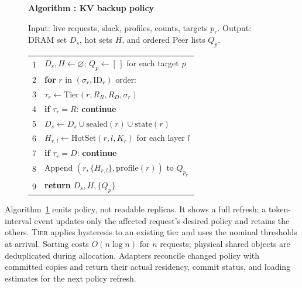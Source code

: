 \begin{figure}[t]
  \raggedright
  \label{alg:placement}
  \noindent\textbf{Algorithm \thedesignalgorithm: KV backup policy}
  \par\smallskip
  \noindent Input: live requests, slack, profiles, counts, targets $p_r$.
  Output: DRAM set $D_s$, hot sets $H$, and ordered Peer lists $Q_p$.
  \par\smallskip
  \begin{tabularx}{\columnwidth}{@{}r@{\quad}X@{}}
    \toprule
    1 & $D_s,H\gets\varnothing$; $Q_p\gets[\,]$ for each target $p$ \\
    2 & \textbf{for} $r$ in $(\sigma_r,\mathrm{ID}_r)$ order: \\
    3 & \quad$\tau_r\gets\mathrm{Tier}(r,R_R,R_D,\sigma_r)$ \\
    4 & \quad\textbf{if} $\tau_r=R$: \textbf{continue} \\
    5 & \quad$D_s\gets D_s\cup\mathrm{sealed}(r)\cup\mathrm{state}(r)$ \\
    6 & \quad$H_{r,l}\gets\mathrm{HotSet}(r,l,K_r)$ for each layer $l$ \\
    7 & \quad\textbf{if} $\tau_r=D$: \textbf{continue} \\
    8 & \quad Append $(r,\{H_{r,l}\},\mathrm{profile}(r))$ to $Q_{p_r}$ \\
    9 & \textbf{return} $D_s,H,\{Q_p\}$ \\
    \bottomrule
  \end{tabularx}
\end{figure}

Algorithm~\ref{alg:placement} emits policy, not readable replicas.
It shows a full refresh; a token-interval event updates only the affected
request's desired policy and retains the others.
\textsc{Tier} applies hysteresis to an existing tier and uses the nominal
thresholds at arrival. Sorting costs $O(n\log n)$ for $n$ requests;
physical shared objects are deduplicated during allocation. Adapters
reconcile changed policy with committed copies and return their actual
residency, commit status, and loading estimates for the next policy refresh.
